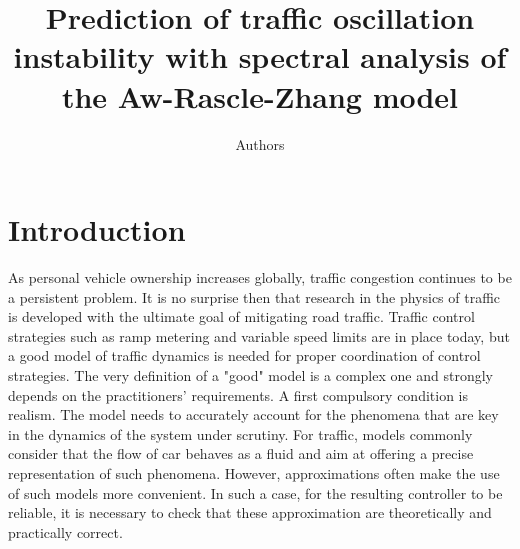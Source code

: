 \documentclass[preprint]{elsarticle}
\begin{document}
\begin{frontmatter}

\title{Prediction of traffic oscillation instability with spectral analysis of the Aw-Rascle-Zhang model}

\author[add]{Authors}
\address[add]{address}
%
%
%

\begin{abstract}

\end{abstract}

\begin{keyword}

\end{keyword}

\end{frontmatter}


\section{Introduction}

As personal vehicle ownership increases globally, traffic congestion
continues to be a persistent problem. It is no surprise then that
research in the physics of traffic is developed with the ultimate
goal of mitigating road traffic. Traffic control strategies such as
ramp metering and variable speed limits are in place today, but a
good model of traffic dynamics is needed for proper coordination of
control strategies. The very definition of a "good" model is a complex one and strongly depends on the practitioners' requirements. A first compulsory condition is realism. The model needs to accurately account for the phenomena that are key in the dynamics of the system under scrutiny. For traffic, models commonly consider that the flow of car behaves as a fluid and aim at offering a precise representation of such phenomena. However, approximations often make the use of such models more convenient. In such a case, for the resulting controller to be reliable, it is necessary to check that these approximation are theoretically and practically correct.\\
\end{document}
